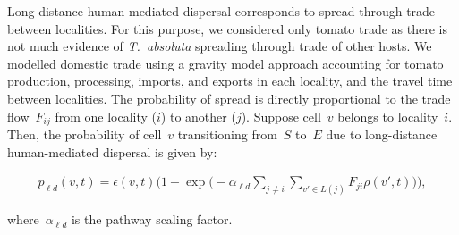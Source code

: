 \documentclass[11pt]{article}
\newcommand{\tuta}{\emph{T.~absoluta}}
\newcommand{\infest}{\rho}
\newcommand{\suitable}{\epsilon}
\newcommand{\pld}{p_{\ell d}}
\newcommand{\ald}{\alpha_{\ell d}}
\newcommand{\locality}{{L}}
\theoremstyle{definition}
\begin{document}
Long-distance human-mediated dispersal corresponds to spread through trade
between localities. For this purpose, we considered only tomato trade as
there is not much evidence of \tuta{} spreading through trade of other
hosts. We modelled domestic trade using a gravity model approach accounting
for tomato production, processing, imports, and exports in each locality,
and the travel time between localities.  The probability of spread is
directly proportional to the trade flow~$F_{ij}$ from one locality ($i$) to
another ($j$).  Suppose cell~$v$ belongs to locality~$i$. Then, the
probability of cell~$v$ transitioning from~$S$ to~$E$ due to long-distance
human-mediated dispersal is given by:
\begin{linenomath}
\begin{align}\label{eqn:pld}
    \pld(v,t)=\suitable(v,t)\bigg(1-
    \exp\Big(-\ald\sum_{j\ne i}\sum_{v'\in\locality(j)}F_{ji}\infest(v',t)\Big)\bigg),
\end{align}
\end{linenomath}
where~$\ald$ is the pathway scaling factor. 
\end{document}
